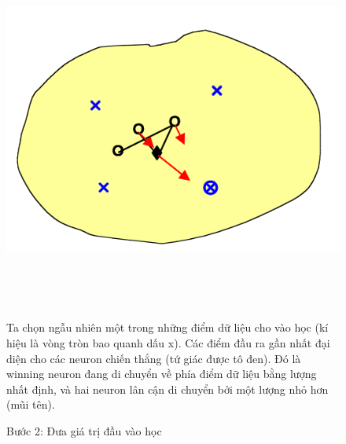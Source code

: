 \begin{figure}[h!]
  \begin{minipage}{0.4\textwidth}
	\centering
    \includegraphics[width=1\textwidth,keepaspectratio=true]{SOM3.png}
    \caption{Bước 2: Đưa giá trị đầu vào học}
  \end{minipage}
  ~
  \begin{minipage}{0.1\textwidth}
  \end{minipage}
  ~
  \begin{minipage}{0.5\textwidth}
  Ta chọn ngẫu nhiên một trong những điểm dữ liệu cho vào học (kí hiệu là vòng tròn bao quanh dấu x). Các điểm đầu ra gần nhất đại diện cho các neuron chiến thắng (tứ giác được tô đen). Đó là winning neuron đang di chuyển về phía điểm dữ liệu bằng lượng nhất định, và hai neuron lân cận di chuyển bởi một lượng nhỏ hơn (mũi tên).
  \end{minipage}
\end{figure}
